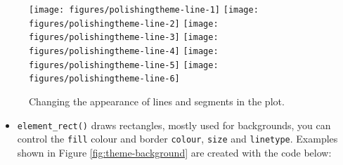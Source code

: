 \begin{Shaded}
\begin{Highlighting}[]
\StringTok{ }\NormalTok{(} \NormalTok{(} \NormalTok{))}
\StringTok{ }\NormalTok{(} \NormalTok{(} \NormalTok{))}
\StringTok{ }\NormalTok{(} \NormalTok{(} \NormalTok{))}
\StringTok{ }\NormalTok{(} \NormalTok{())}
\StringTok{ }\NormalTok{(} \NormalTok{(} \NormalTok{))}
\StringTok{ }\NormalTok{(} \NormalTok{(} \NormalTok{, } \NormalTok{))}
\end{Highlighting}
\end{Shaded}

\begin{figure}

{\centering \texttt{[image: figures/polishingtheme-line-1]} \texttt{[image: figures/polishingtheme-line-2]} \texttt{[image: figures/polishingtheme-line-3]} \texttt{[image: figures/polishingtheme-line-4]} \texttt{[image: figures/polishingtheme-line-5]} \texttt{[image: figures/polishingtheme-line-6]} 

}

\caption{Changing the appearance of lines and segments in the plot.\label{fig:theme-line}}
\end{figure}

\begin{itemize}
\itemsep1pt\parskip0pt
\item
  \texttt{element\_rect()} draws rectangles, mostly used for
  backgrounds, you can control the \texttt{fill} colour and border
  \texttt{colour}, \texttt{size} and \texttt{linetype}. Examples shown
  in Figure \ref{fig:theme-background} are created with the code below:
    
\end{itemize}

